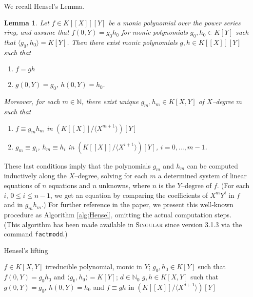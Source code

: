\documentclass[a4paper,11pt]{amsart}%
\theoremstyle{definition}
\theoremstyle{plain}
\newtheorem{lemma}[defn]{Lemma}
\theoremstyle{remark}
\newcommand{\N}{{\mathbb N}}
\begin{document}
We recall Hensel's Lemma.

\begin{lemma}
\label{lemma:hensel} Let $f \in K[[X]][Y]$ be a monic polynomial over the
power series ring, and assume that $f(0, Y) = g_{0} h_{0}$ for monic
polynomials $g_{0}, h_{0} \in K[Y]$ such that $\langle g_{0}, h_{0}\rangle=
K[Y]$. Then there exist monic polynomials $g, h \in K[[X]][Y]$ such that

\begin{enumerate}
\item $f = gh$

\item $g(0, Y) = g_{0}$, $h(0, Y) = h_{0}$.
\end{enumerate}

Moreover, for each $m \in{\mathbb{N}}$, there exist unique $g_{m}, h_{m} \in
K[X,Y]$ of $X$--degree $m$ such that

\begin{enumerate}
\item $f \equiv g_{m} h_{m}$ in $(K[[X]] / \langle X^{m+1} \rangle)[Y]$

\item $g_{m} \equiv g_{i}$, $h_{m} \equiv h_{i}$ in $(K[[X]]/ \langle X^{i+1}
\rangle)[Y]$, $i = 0, \dots, m-1$.
\end{enumerate}
\end{lemma}

These last conditions imply that the polynomials $g_{m}$ and $h_{m}$ can be
computed inductively along the $X$--degree, solving for each $m$ a determined
system of linear equations of $n$ equations and $n$ unknowns, where $n$ is the
$Y$--degree of $f$. (For each $i$, $0 \leq i \leq n-1$, we get an equation by
comparing the coefficients of $X^{m}Y^{i}$ in $f$ and in $g_{m}h_{m}$.) For
further reference in the paper, we present this well-known procedure as
Algorithm \ref{alg:Hensel}, omitting the actual computation steps. (This
algorithm has been made available in \textsc{Singular}{} since version 3.1.3
via the command \texttt{factmodd}.)

\begin{algorithm}                      %
\caption{Hensel's lifting}          %
\label{alg:Hensel}
\begin{algorithmic}[1]
\REQUIRE $f \in K[X,Y]$ irreducible polynomial, monic in $Y$; $g_0, h_0 \in K[Y]$ such that $f(0, Y) = g_0 h_0$ and $\langle g_0, h_0 \rangle = K[Y]$; $d \in \N_0$
\ENSURE $g, h \in K[X,Y]$ such that $g(0, Y) = g_0$, $h(0, Y) = h_0$ and $f \equiv gh$ in $(K[[X]]/ \langle X^{d+1} \rangle)[Y]$
\end{algorithmic}
\end{algorithm}
\end{document}
